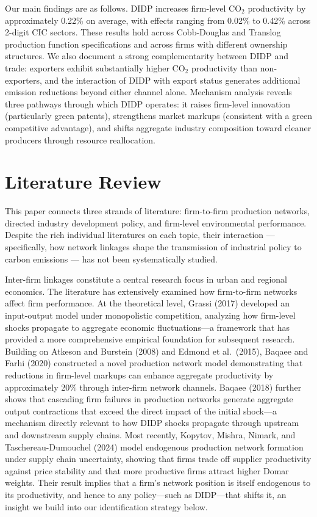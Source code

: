 \documentclass[11pt,a4paper]{article}
\begin{document}
Our main findings are as follows. DIDP increases firm-level CO$_2$ productivity by approximately 0.22\% on average, with effects ranging from 0.02\% to 0.42\% across 2-digit CIC sectors. These results hold across Cobb-Douglas and Translog production function specifications and across firms with different ownership structures. We also document a strong complementarity between DIDP and trade: exporters exhibit substantially higher CO$_2$ productivity than non-exporters, and the interaction of DIDP with export status generates additional emission reductions beyond either channel alone. Mechanism analysis reveals three pathways through which DIDP operates: it raises firm-level innovation (particularly green patents), strengthens market markups (consistent with a green competitive advantage), and shifts aggregate industry composition toward cleaner producers through resource reallocation.

\section{Literature Review}

This paper connects three strands of literature: firm-to-firm production networks, directed industry development policy, and firm-level environmental performance. Despite the rich individual literatures on each topic, their interaction --- specifically, how network linkages shape the transmission of industrial policy to carbon emissions --- has not been systematically studied.

Inter-firm linkages constitute a central research focus in urban and regional economics. The literature has extensively examined how firm-to-firm networks affect firm performance. At the theoretical level, Grassi (2017) developed an input-output model under monopolistic competition, analyzing how firm-level shocks propagate to aggregate economic fluctuations---a framework that has provided a more comprehensive empirical foundation for subsequent research. Building on Atkeson and Burstein (2008) and Edmond et al.\ (2015), Baqaee and Farhi (2020) constructed a novel production network model demonstrating that reductions in firm-level markups can enhance aggregate productivity by approximately 20\% through inter-firm network channels. Baqaee (2018) further shows that cascading firm failures in production networks generate aggregate output contractions that exceed the direct impact of the initial shock---a mechanism directly relevant to how DIDP shocks propagate through upstream and downstream supply chains. Most recently, Kopytov, Mishra, Nimark, and Taschereau-Dumouchel (2024) model endogenous production network formation under supply chain uncertainty, showing that firms trade off supplier productivity against price stability and that more productive firms attract higher Domar weights. Their result implies that a firm's network position is itself endogenous to its productivity, and hence to any policy---such as DIDP---that shifts it, an insight we build into our identification strategy below.
\end{document}
